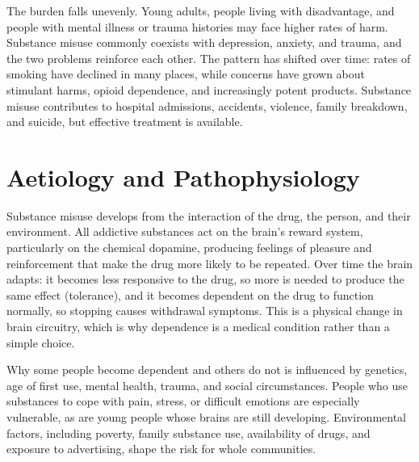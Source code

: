 The burden falls unevenly. Young adults, people living with disadvantage, and people with mental illness or trauma histories may face higher rates of harm. Substance misuse commonly coexists with depression, anxiety, and trauma, and the two problems reinforce each other. The pattern has shifted over time: rates of smoking have declined in many places, while concerns have grown about stimulant harms, opioid dependence, and increasingly potent products. Substance misuse contributes to hospital admissions, accidents, violence, family breakdown, and suicide, but effective treatment is available.

\section*{Aetiology and Pathophysiology}
Substance misuse develops from the interaction of the drug, the person, and their environment. All addictive substances act on the brain's reward system, particularly on the chemical dopamine, producing feelings of pleasure and reinforcement that make the drug more likely to be repeated. Over time the brain adapts: it becomes less responsive to the drug, so more is needed to produce the same effect (tolerance), and it becomes dependent on the drug to function normally, so stopping causes withdrawal symptoms. This is a physical change in brain circuitry, which is why dependence is a medical condition rather than a simple choice.

Why some people become dependent and others do not is influenced by genetics, age of first use, mental health, trauma, and social circumstances. People who use substances to cope with pain, stress, or difficult emotions are especially vulnerable, as are young people whose brains are still developing. Environmental factors, including poverty, family substance use, availability of drugs, and exposure to advertising, shape the risk for whole communities.


